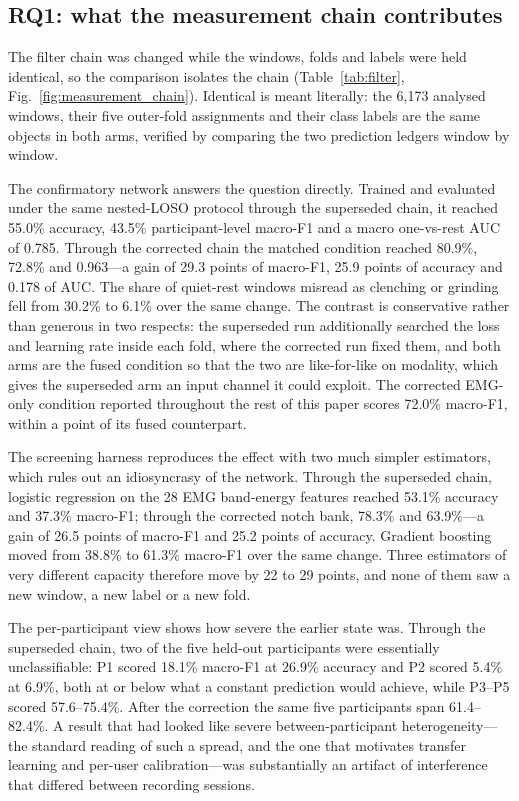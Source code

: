 \documentclass[pdflatex,sn-nature,iicol]{sn-jnl}
\begin{document}
\subsection{RQ1: what the measurement chain contributes}
\label{sec:rq1}

The filter chain was changed while the windows, folds and labels were held identical, so the comparison isolates the chain (Table~\ref{tab:filter}, Fig.~\ref{fig:measurement_chain}). Identical is meant literally: the 6,173 analysed windows, their five outer-fold assignments and their class labels are the same objects in both arms, verified by comparing the two prediction ledgers window by window.

The confirmatory network answers the question directly. Trained and evaluated under the same nested-LOSO protocol through the superseded chain, it reached 55.0\% accuracy, 43.5\% participant-level macro-F1 and a macro one-vs-rest AUC of 0.785. Through the corrected chain the matched condition reached 80.9\%, 72.8\% and 0.963---a gain of 29.3 points of macro-F1, 25.9 points of accuracy and 0.178 of AUC. The share of quiet-rest windows misread as clenching or grinding fell from 30.2\% to 6.1\% over the same change. The contrast is conservative rather than generous in two respects: the superseded run additionally searched the loss and learning rate inside each fold, where the corrected run fixed them, and both arms are the fused condition so that the two are like-for-like on modality, which gives the superseded arm an input channel it could exploit. The corrected EMG-only condition reported throughout the rest of this paper scores 72.0\% macro-F1, within a point of its fused counterpart.

The screening harness reproduces the effect with two much simpler estimators, which rules out an idiosyncrasy of the network. Through the superseded chain, logistic regression on the 28 EMG band-energy features reached 53.1\% accuracy and 37.3\% macro-F1; through the corrected notch bank, 78.3\% and 63.9\%---a gain of 26.5 points of macro-F1 and 25.2 points of accuracy. Gradient boosting moved from 38.8\% to 61.3\% macro-F1 over the same change. Three estimators of very different capacity therefore move by 22 to 29 points, and none of them saw a new window, a new label or a new fold.

The per-participant view shows how severe the earlier state was. Through the superseded chain, two of the five held-out participants were essentially unclassifiable: P1 scored 18.1\% macro-F1 at 26.9\% accuracy and P2 scored 5.4\% at 6.9\%, both at or below what a constant prediction would achieve, while P3--P5 scored 57.6--75.4\%. After the correction the same five participants span 61.4--82.4\%. A result that had looked like severe between-participant heterogeneity---the standard reading of such a spread, and the one that motivates transfer learning and per-user calibration---was substantially an artifact of interference that differed between recording sessions.
\end{document}
